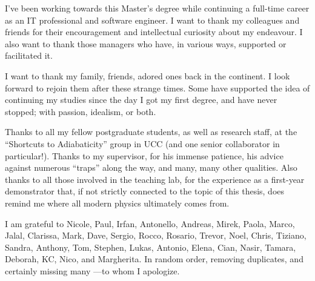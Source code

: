 {

  I've been working towards this Master's degree
  while continuing a full-time career
  as an IT professional and software engineer.
  I want to thank my
  colleagues and friends for their encouragement
  and intellectual curiosity
  about my endeavour.
  I also want to thank those managers
  who have, in various ways, supported or facilitated it.

  I want to thank my family, friends, adored ones back in the continent.
  I look forward to rejoin them after these strange times.
  Some have supported the idea of continuing my studies since the day I got my first degree,
  and have never stopped; with passion, idealism, or both.
  
  Thanks to all my fellow postgraduate students,
  as well as research staff,
  at the ``Shortcuts to Adiabaticity'' group in UCC
  (and one senior collaborator in particular!).
  Thanks to my supervisor, for his immense patience,
  his advice against numerous ``traps'' along the way, and many, many other qualities.
  Also thanks to all those involved in the teaching lab, for the experience as a
  first-year demonstrator that,
  if not strictly connected to the topic of this thesis,
  does remind me where all modern physics ultimately comes from.

  I am grateful to
  Nicole,
  Paul,
  Irfan,
  Antonello,
  Andreas,
  Mirek,
  Paola,
  Marco,
  Jalal,
  Clarissa,
  Mark,
  Dave,
  Sergio,
  Rocco,
  Rosario,
  Trevor,
  Noel,
  Chris,
  Tiziano,
  Sandra,
  Anthony,
  Tom,
  Stephen,
  Lukas,
  Antonio,
  Elena,
  Cian,
  Nasir,
  Tamara,
  Deborah,
  KC,
  Nico,
  and Margherita.
  In random order, removing duplicates, and certainly missing many ---to whom I apologize.
}
